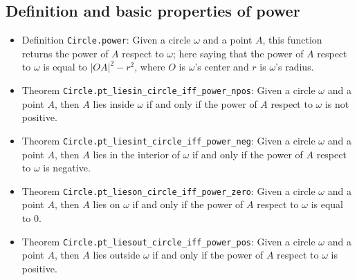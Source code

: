 \documentclass[12pt]{amsart}
\begin{document}
\subsection{Definition and basic properties of power}
\begin{itemize}
    \item Definition \verb|Circle.power|: Given a circle $\omega$ and a point $A$, this function returns the power of $A$ respect to $\omega$; here saying that the power of $A$ respect to $\omega$ is equal to $|OA|^2-r^2$, where $O$ is $\omega$'s center and $r$ is $\omega$'s radius.
    \item Theorem \verb|Circle.pt_liesin_circle_iff_power_npos|: Given a circle $\omega$ and a point $A$, then $A$ lies inside $\omega$ if and only if the power of $A$ respect to $\omega$ is not positive.
    \item Theorem \verb|Circle.pt_liesint_circle_iff_power_neg|: Given a circle $\omega$ and a point $A$, then $A$ lies in the interior of $\omega$ if and only if the power of $A$ respect to $\omega$ is negative.
    \item Theorem \verb|Circle.pt_lieson_circle_iff_power_zero|: Given a circle $\omega$ and a point $A$, then $A$ lies on $\omega$ if and only if the power of $A$ respect to $\omega$ is equal to $0$.
    \item Theorem \verb|Circle.pt_liesout_circle_iff_power_pos|: Given a circle $\omega$ and a point $A$, then $A$ lies outside $\omega$ if and only if the power of $A$ respect to $\omega$ is positive.
\end{itemize}
\end{document}
